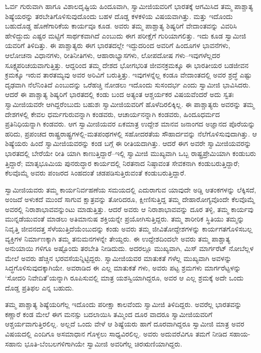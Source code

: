 ಓರ್ವ ಗುರುವಾಗಿ ಹಾಗೂ ವಿಶಾಲದೃಷ್ಟಿಯ ಹಿಂದೂವಾಗಿ, ಸ್ವಾಮೀಜಿಯವರಿಗೆ ಭಾರತಕ್ಕೆ ಆಗಮಿಸಿದ ತಮ್ಮ ಪಾಶ್ಚಾತ್ಯ ಶಿಷ್ಯೆಯರನ್ನು ತರಬೇತಿಗೊಳಿಸುವುದೊಂದು ಬಹಳ ದೊಡ್ಡ ಕಳಕಳಿಯ ವಿಷಯವಾಗಿತ್ತು. ಮತ್ತು ಇದೊಂದು ಬಹುದೊಡ್ಡ ಹೊಣೆಗಾರಿಕೆಯ ಕಾರ್ಯವೂ ಕೂಡ. ಅವರು ತಮ್ಮ ಪಾಶ್ಚಾತ್ಯ ಶಿಷ್ಯರಿಗೆ ವೇದಾಂತವನ್ನು ವಿವರಿಸಿ ಹೇಳಿದ್ದುದು ಎಷ್ಟರ ಮಟ್ಟಿಗೆ ಸಾರ್ಥಕವಾಗಿದೆ ಎಂಬುದು ಈಗ ಪರೀಕ್ಷೆಗೆ ಗುರಿಯಾಗಲಿತ್ತು. ಇದು ಕೂಡ ಸ್ವಾಮೀಜಿ ಯವರಿಗೆ ತಿಳಿದಿತ್ತು. ಈ ಪಾಶ್ಚಾತ್ಯರು ಈಗ ಭಾರತದಲ್ಲೇ ಇದ್ದುದರಿಂದ ಅವರಿಗೆ ಹಿಂದೂಗಳ ಭಾವನೆಗಳು, ಆಲೋಚನಾ ವಿಧಾನಗಳು, ರೀತಿನೀತಿಗಳು, ಆಹಾರಾಭ್ಯಾಸಗಳು, ಲೋಪದೋಷ ಗಳು–ಇವುಗಳೆಲ್ಲದರ ಸೂಕ್ಷ್ಮಪರಿಚಯವಾಗುತ್ತಿತ್ತು. ಆದ್ದರಿಂದ ತಮ್ಮ ದೇಶದ ಭೋಗಭರಿತ ಜೀವನಕ್ರಮಕ್ಕೂ ಈ ಭಾರತೀಯರ ಬಡಜೀವನ ಕ್ರಮಕ್ಕೂ ಇರುವ ತಾರತಮ್ಯವು ಅವರ ಅರಿವಿಗೆ ಬರುತ್ತಿತ್ತು. ಇವುಗಳನ್ನೆಲ್ಲ ಕಂಡೂ ವೇದಾಂತದಲ್ಲಿ ಅವರ ಶ್ರದ್ಧೆ ಎಷ್ಟು ದೃಢವಾಗಿ ನೆಲೆನಿಂತಿದೆ ಎಂಬುದನ್ನು ಒರೆಹಚ್ಚಿ ನೋಡಲು ಇದೊಂದು ಸುಸಂದರ್ಭ ಎಂದು ಸ್ವಾಮೀಜಿ ಭಾವಿಸಿದರು. ಆದರೆ ಈ ಪಾಶ್ಚಾತ್ಯ ಶಿಷ್ಯರಿಗೆ ಭಾರತದಲ್ಲಿ ಕಂಡು ಬಂದ ಅತ್ಯಂತ ಆಶ್ಚರ್ಯಕರ ವಿಷಯವೆಂದರೆ ಅದು ಸ್ವತಃ ಸ್ವಾಮೀಜಿಯವರೇ ಆಗಿದ್ದರೆಂಬುದು ಬಹುಶಃ ಸ್ವಾಮೀಜಿಯವರಿಗೆ ಹೊಳೆದಿರಲಿಕ್ಕಿಲ್ಲ. ಈ ಪಾಶ್ಚಾತ್ಯರು ಅವರನ್ನು ತಮ್ಮ ದೇಶಗಳಲ್ಲಿ ಕೇವಲ ಧರ್ಮಗುರುವನ್ನಾಗಿ ಕಂಡವರು, ಆಚಾರ್ಯನನ್ನಾಗಿ ಕಂಡವರು, ಹಿಂದೂಧರ್ಮದ ಪ್ರತಿನಿಧಿಯನ್ನಾಗಿ ಕಂಡವರು. ಆಗ ಸ್ವಾಮೀಜಿಯವರ ಏಕಮಾತ್ರ ಉದ್ದೇಶ ಮಾನವ ಜನಾಂಗದ ಅಜ್ಞಾನದ ಪೊರೆಯನ್ನು ಹರಿದು, ಪ್ರಪಂಚದ ರಾಷ್ಟ್ರರಾಷ್ಟ್ರಗಳಲ್ಲಿ-ಮತಪಂಥಗಳಲ್ಲಿ ಸಹೋದರತೆಯ ಸೌಹಾರ್ದವನ್ನು ನೆಲೆಗೊಳಿಸುವುದಾಗಿತ್ತು. ಆ ಶಿಷ್ಯೆಯರು ಹಿಂದೆ ಸ್ವಾಮೀಜಿಯವರನ್ನು ಕಂಡ ಬಗ್ಗೆ ಈ ರೀತಿಯದಾಗಿತ್ತು. ಆದರೆ ಈಗ ಅವರೇ ಸ್ವಾಮೀಜಿಯವರನ್ನು ಭಾರತದಲ್ಲಿ ಬೇರೆಯೇ ರೀತಿ ಯಾಗಿ ಕಾಣುತ್ತಿದ್ದಾರೆ–ಇಲ್ಲಿ ಸ್ವಾಮೀಜಿ ಮುಖ್ಯವಾಗಿ ಒಬ್ಬ ರಾಷ್ಟ್ರಪ್ರೇಮಿಯಾಗಿ ಕಂಡುಬರು ತ್ತಿದ್ದಾರೆ; ಮಾತೃಭೂಮಿಯ ಪುನರುದ್ಧಾರ ಕಾರ್ಯದಲ್ಲಿ ನಿರತನಾದ ನಿಷ್ಠಾವಂತ ಸೇವಕನಾಗಿ ಕಂಡುಬರುತ್ತಿದ್ದಾರೆ; ಕೆಲವೊಮ್ಮೆ ಅವರು ಪಂಜರದ ಸಿಂಹದಂತೆ ಚಡಪಡಿಸುತ್ತಿರುವಂತೆ ಕಂಡುಬರುತ್ತಿದ್ದಾರೆ.

ಸ್ವಾಮೀಜಿಯವರು ತಮ್ಮ ಕಾರ್ಯನಿರ್ವಹಣೆಯ ಸಮಯದಲ್ಲಿ ಎದುರಾಗುವ ಯಾವುದೇ ಅಡ್ಡಿ ಆತಂಕಗಳನ್ನು ಲೆಕ್ಕಿಸದೆ, ಅಂಜದೆ ಅಳುಕದೆ ಮುಂದೆ ಸಾಗುವ ಕ್ಷಾತ್ರವನ್ನು ತೋರಿದರೂ, ಕ್ಷೀಣಿಸುತ್ತಿದ್ದ ತಮ್ಮ ದೇಹಾರೋಗ್ಯವೊಂದೇ ಕೆಲವೊಮ್ಮೆ ಅವರಲ್ಲಿ ನಿರಾಶಾಭಾವವನ್ನುಂಟು ಮಾಡುತ್ತಿತ್ತು. ಆದರೆ ಅವರು ಆ ನಿರಾಶಾಭಾವವನ್ನು ದೂರ ತಳ್ಳಿ, ತಮ್ಮ ಕಾರ್ಯವು ಮುನ್ನಡೆಯುವಂತೆ ಮಾಡಲು ಅತಿಮಾನುಷ ಶಕ್ತಿಯನ್ನೇ ಪ್ರಯೋಗಿಸುತ್ತಿದ್ದರು. ತಮ್ಮ ಶಾರೀರಿಕ ಸ್ಥಿತಿಯು ತಮ್ಮನ್ನು ನಿವೃತ್ತಿ ಜೀವನದತ್ತ ಸೆಳೆಯುತ್ತಿದೆಯೆಂಬುದನ್ನು ಕಂಡು ಅವರು ತಮ್ಮ ಜೀವಿತೋದ್ದೇಶಗಳನ್ನು ಕಾರ್ಯಗತಗೊಳಿಸಬಲ್ಲ ವ್ಯಕ್ತಿಗಳ ನಿರ್ಮಾಣಕ್ಕಾಗಿ ತಮ್ಮ ತನುಮನಗಳನ್ನೇ ತೇಯ್ದರು. ಈ ಉದ್ದೇಶದಿಂದಲೇ ಅವರು ತಮ್ಮ ಪಾಶ್ಚಾತ್ಯ ಅನುಯಾಯಿ ಗಳಿಗೂ ಅಷ್ಟೊಂದು ತರಬೇತಿ ನೀಡಿದುದು. ಅದರಲ್ಲೂ ಮುಖ್ಯವಾಗಿ, ಮಿಸ್ ಮಾರ್ಗರೆಟ್ ನೋಬೆಲ್ಲಳ ಮೇಲೆ ಅವರು ಹೆಚ್ಚಿನ ಭರವಸೆಯನ್ನಿಟ್ಟಿದ್ದರು. ಸ್ವಾಮೀಜಿಯವರ ಮಾತುಕತೆ ಗಳೆಲ್ಲ ಮುಖ್ಯವಾಗಿ ಅವಳನ್ನು ಸಿದ್ಧಗೊಳಿಸುವುದಕ್ಕಾಗಿಯೇ. ಅವರಾಡಿದ ಈ ಎಲ್ಲ ಮಾತುಕತೆ ಗಳು, ಅವರು ಪಟ್ಟ ಶ್ರಮಗಳು ಮಾರ್ಗರೆಟ್ಟಳನ್ನು ‘ಸೋದರಿ ನಿವೇದಿತೆ’ಯನ್ನಾಗಿ ರೂಪಿಸುವಲ್ಲಿ ಮಾತ್ರ ಯಶಸ್ವಿಯಾಗಿದ್ದರೂ, ಅವರ ಆ ಎಲ್ಲ ಶ್ರಮಕ್ಕೆ ಅದೇ ಒಂದು ದೊಡ್ಡ ಪ್ರತಿಫಲ ಎನ್ನ ಬಹುದು.

ತಮ್ಮ ಪಾಶ್ಚಾತ್ಯ ಶಿಷ್ಯೆಯರಿಗೆಲ್ಲ ಇದೊಂದು ಪರೀಕ್ಷಾ ಕಾಲವೆಂದು ಸ್ವಾಮೀಜಿ ತಿಳಿದಿದ್ದರು. ಅವರೆಲ್ಲ ಭಾರತವನ್ನು ಕಣ್ಣಾರೆ ಕಂಡ ಮೇಲೆ ಈಗ ಮನಸ್ಸು ಬದಲಾಯಿಸಿ ತಮ್ಮಿಂದ ದೂರ ವಾದರೂ ಸ್ವಾಮೀಜಿಯವರಿಗೆ ಆಶ್ಚರ್ಯವಾಗುತ್ತಿರಲಿಲ್ಲ. ಅಲ್ಲದೆ ಒಂದು ವೇಳೆ ಆ ಶಿಷ್ಯೆಯರು ಹಾಗೆ ದೂರವಾಗಿದ್ದರೂ ಸ್ವಾಮೀಜಿ ಮಾತ್ರ ಅವರ ವಿಷಯದಲ್ಲಿ ಎಂದಿಗೂ ಅಸಮಾಧಾನ ಗೊಳ್ಳಲು ಸಾಧ್ಯವಿರಲಿಲ್ಲ. ಅವರು ಅದುವರೆವಿಗೂ ತಮಗೆ ನೀಡಿದ ಸಹಾಯ-ಸಹಾನು ಭೂತಿ-ಬೆಂಬಲಗಳಿಗಾಗಿಯೇ ಸ್ವಾಮೀಜಿ ಅವರಿಗೆಲ್ಲ ಚಿರಋಣಿಯಾಗಿದ್ದರು.

